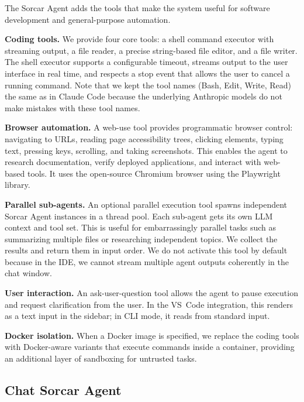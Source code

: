 \documentclass{article}
\begin{document}
The Sorcar Agent adds the tools that make the system useful for software development and general-purpose automation.

\textbf{Coding tools.}  We provide four core tools: a shell command executor with streaming output, a file reader, a precise string-based file editor, and a file writer.  The shell executor supports a configurable timeout, streams output to the user interface in real time, and respects a stop event that allows the user to cancel a running command.  Note that we kept the tool names (Bash, Edit, Write, Read) the same as in Claude Code because the underlying Anthropic models do not make mistakes with these tool names.

\textbf{Browser automation.}  A web-use tool provides programmatic browser control: navigating to URLs, reading page accessibility trees, clicking elements, typing text, pressing keys, scrolling, and taking screenshots.  This enables the agent to research documentation, verify deployed applications, and interact with web-based tools. It uses the open-source Chromium browser using the Playwright library. 

\textbf{Parallel sub-agents.}  An optional parallel execution tool spawns independent Sorcar Agent instances in a thread pool.  Each sub-agent gets its own LLM context and tool set.  This is useful for embarrassingly parallel tasks such as summarizing multiple files or researching independent topics.  We collect the results and return them in input order.  We do not activate this tool by default because in the IDE, we cannot stream multiple agent outputs coherently in the chat window.

\textbf{User interaction.}  An ask-user-question tool allows the agent to pause execution and request clarification from the user.  In the VS~Code integration, this renders as a text input in the sidebar; in CLI mode, it reads from standard input.

\textbf{Docker isolation.}  When a Docker image is specified, we replace the coding tools with Docker-aware variants that execute commands inside a container, providing an additional layer of sandboxing for untrusted tasks.

\subsection{Chat Sorcar Agent}
\label{sec:chat-agent}
\end{document}
